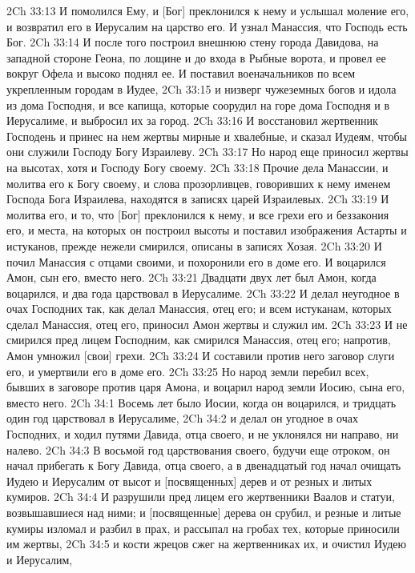 2Ch 33:13  И помолился Ему, и [Бог] преклонился к нему и услышал моление его, и возвратил его в Иерусалим на царство его. И узнал Манассия, что Господь есть Бог.
2Ch 33:14  И после того построил внешнюю стену города Давидова, на западной стороне Геона, по лощине и до входа в Рыбные ворота, и провел ее вокруг Офела и высоко поднял ее. И поставил военачальников по всем укрепленным городам в Иудее,
2Ch 33:15  и низверг чужеземных богов и идола из дома Господня, и все капища, которые соорудил на горе дома Господня и в Иерусалиме, и выбросил их за город.
2Ch 33:16  И восстановил жертвенник Господень и принес на нем жертвы мирные и хвалебные, и сказал Иудеям, чтобы они служили Господу Богу Израилеву.
2Ch 33:17  Но народ еще приносил жертвы на высотах, хотя и Господу Богу своему.
2Ch 33:18  Прочие дела Манассии, и молитва его к Богу своему, и слова прозорливцев, говоривших к нему именем Господа Бога Израилева, находятся в записях царей Израилевых.
2Ch 33:19  И молитва его, и то, что [Бог] преклонился к нему, и все грехи его и беззакония его, и места, на которых он построил высоты и поставил изображения Астарты и истуканов, прежде нежели смирился, описаны в записях Хозая.
2Ch 33:20  И почил Манассия с отцами своими, и похоронили его в доме его. И воцарился Амон, сын его, вместо него.
2Ch 33:21  Двадцати двух лет был Амон, когда воцарился, и два года царствовал в Иерусалиме.
2Ch 33:22  И делал неугодное в очах Господних так, как делал Манассия, отец его; и всем истуканам, которых сделал Манассия, отец его, приносил Амон жертвы и служил им.
2Ch 33:23  И не смирился пред лицем Господним, как смирился Манассия, отец его; напротив, Амон умножил [свои] грехи.
2Ch 33:24  И составили против него заговор слуги его, и умертвили его в доме его.
2Ch 33:25  Но народ земли перебил всех, бывших в заговоре против царя Амона, и воцарил народ земли Иосию, сына его, вместо него.
2Ch 34:1  Восемь лет было Иосии, когда он воцарился, и тридцать один год царствовал в Иерусалиме,
2Ch 34:2  и делал он угодное в очах Господних, и ходил путями Давида, отца своего, и не уклонялся ни направо, ни налево.
2Ch 34:3  В восьмой год царствования своего, будучи еще отроком, он начал прибегать к Богу Давида, отца своего, а в двенадцатый год начал очищать Иудею и Иерусалим от высот и [посвященных] дерев и от резных и литых кумиров.
2Ch 34:4  И разрушили пред лицем его жертвенники Ваалов и статуи, возвышавшиеся над ними; и [посвященные] дерева он срубил, и резные и литые кумиры изломал и разбил в прах, и рассыпал на гробах тех, которые приносили им жертвы,
2Ch 34:5  и кости жрецов сжег на жертвенниках их, и очистил Иудею и Иерусалим,
